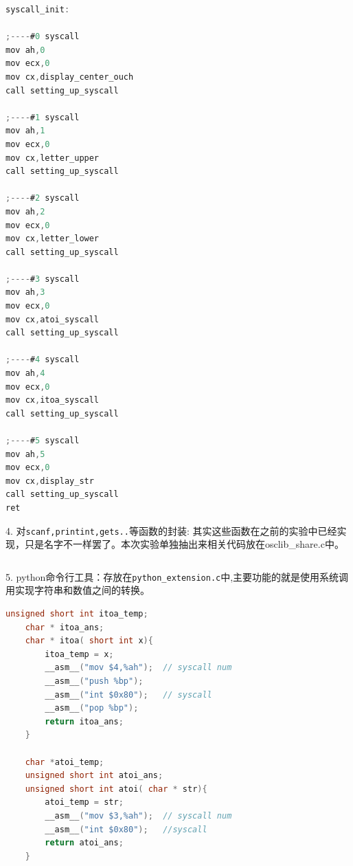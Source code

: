\documentclass[a4paper]{article}
\begin{document}
{{{{\scriptsize
	\begin{lstlisting}[language={C}]
syscall_init:

;----#0 syscall
mov ah,0
mov ecx,0
mov cx,display_center_ouch
call setting_up_syscall

;----#1 syscall
mov ah,1
mov ecx,0
mov cx,letter_upper
call setting_up_syscall

;----#2 syscall
mov ah,2
mov ecx,0
mov cx,letter_lower
call setting_up_syscall

;----#3 syscall
mov ah,3
mov ecx,0
mov cx,atoi_syscall
call setting_up_syscall

;----#4 syscall
mov ah,4
mov ecx,0
mov cx,itoa_syscall
call setting_up_syscall

;----#5 syscall
mov ah,5
mov ecx,0
mov cx,display_str
call setting_up_syscall
ret
	\end{lstlisting}}
	4. 对\verb|scanf,printint,gets..|等函数的封装:
	其实这些函数在之前的实验中已经实现，只是名字不一样罢了。本次实验单独抽出来相关代码放在osclib\_share.c中。
	{\scriptsize
	\begin{lstlisting}[language={C}]
	\end{lstlisting}}
	5. python命令行工具：存放在\verb|python_extension.c|中,主要功能的就是使用系统调用实现字符串和数值之间的转换。
	\begin{lstlisting}[language={C}]
	unsigned short int itoa_temp;
	char * itoa_ans;
	char * itoa( short int x){
		itoa_temp = x;
		__asm__("mov $4,%ah");  // syscall num
		__asm__("push %bp");
		__asm__("int $0x80");	// syscall
		__asm__("pop %bp");
		return itoa_ans;
	}

	char *atoi_temp;
	unsigned short int atoi_ans;
	unsigned short int atoi( char * str){
		atoi_temp = str;
		__asm__("mov $3,%ah");  // syscall num
		__asm__("int $0x80");	//syscall
		return atoi_ans;
	}
	\end{lstlisting}
}

}}
\end{document}

